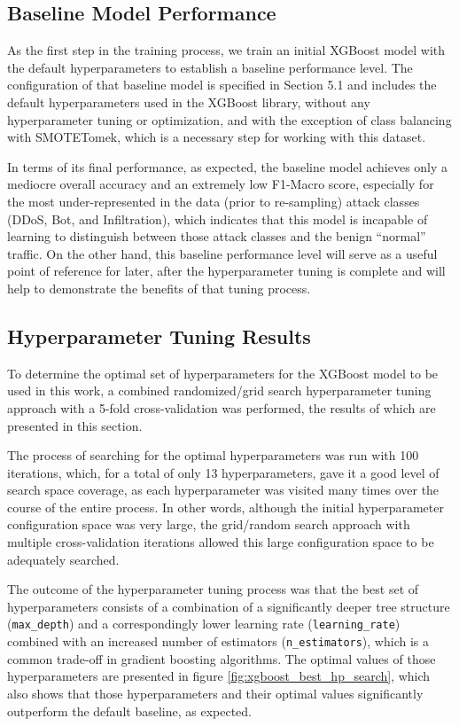 \subsection{Baseline Model Performance}

As the first step in the training process, we train an initial XGBoost model with the default hyperparameters to establish a baseline performance level. The configuration of that baseline model is specified in Section 5.1 and includes the default hyperparameters used in the XGBoost library, without any hyperparameter tuning or optimization, and with the exception of class balancing with SMOTETomek, which is a necessary step for working with this dataset.

In terms of its final performance, as expected, the baseline model achieves only a mediocre overall accuracy and an extremely low F1-Macro score, especially for the most under-represented in the data (prior to re-sampling) attack classes (DDoS, Bot, and Infiltration), which indicates that this model is incapable of learning to distinguish between those attack classes and the benign “normal” traffic. On the other hand, this baseline performance level will serve as a useful point of reference for later, after the hyperparameter tuning is complete and will help to demonstrate the benefits of that tuning process.

\subsection{Hyperparameter Tuning Results}

To determine the optimal set of hyperparameters for the XGBoost model to be used in this work, a combined randomized/grid search hyperparameter tuning approach with a 5-fold cross-validation was performed, the results of which are presented in this section.

The process of searching for the optimal hyperparameters was run with 100 iterations, which, for a total of only 13 hyperparameters, gave it a good level of search space coverage, as each hyperparameter was visited many times over the course of the entire process. In other words, although the initial hyperparameter configuration space was very large, the grid/random search approach with multiple cross-validation iterations allowed this large configuration space to be adequately searched.

The outcome of the hyperparameter tuning process was that the best set of hyperparameters consists of a combination of a significantly deeper tree structure (\texttt{max\_depth}) and a correspondingly lower learning rate (\texttt{learning\_rate}) combined with an increased number of estimators (\texttt{n\_estimators}), which is a common trade-off in gradient boosting algorithms. The optimal values of those hyperparameters are presented in figure \ref{fig:xgboost_best_hp_search}, which also shows that those hyperparameters and their optimal values significantly outperform the default baseline, as expected.

